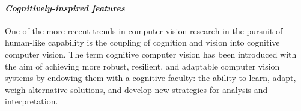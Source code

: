 
\paragraph{\textit{Cognitively-inspired features}\label{proposed-cognitive}}
One of the more recent trends in computer vision research in the pursuit of human-like capability is the coupling of cognition and vision into cognitive computer vision. The term cognitive computer vision has been introduced with the aim of achieving more robust, resilient, and adaptable computer vision systems by endowing them with a cognitive faculty: the ability to learn, adapt, weigh alternative solutions, and develop new strategies for analysis and interpretation.

